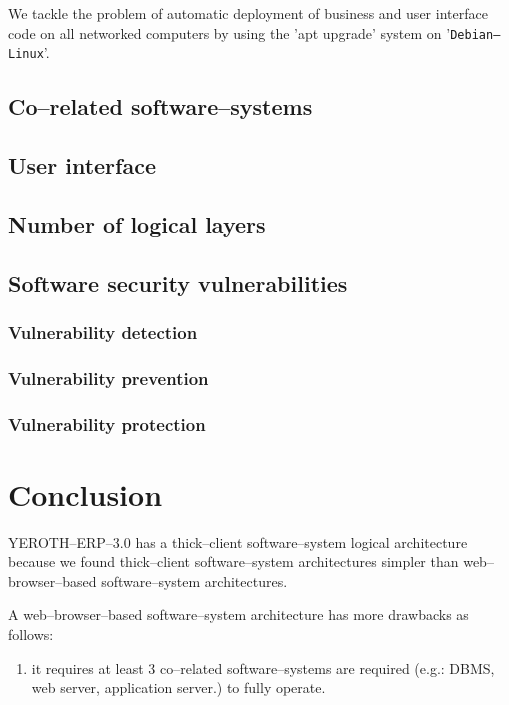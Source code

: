 \documentclass[a4paper, 10pt]{article}
\newcommand{\debianlinux}{\texttt{Debian--Linux}\xspace}
\newcommand{\webbrowserbased}{web--browser--based\xspace}
\newcommand{\yerotherpblack}{YEROTH--ERP--$3.0$\xspace}
\newcommand{\thickclient}{thick--client\xspace}
\begin{document}
\begin{multicols}{2}
We tackle the problem of automatic deployment of
business and user interface code on all networked
computers by using the 'apt upgrade' system 
on '\debianlinux'.

\subsection{Co--related software--systems}


\subsection{User interface}


\subsection{Number of logical layers}


\subsection{Software security vulnerabilities}

\subsubsection{Vulnerability detection}

\subsubsection{Vulnerability prevention}

\subsubsection{Vulnerability protection}

\section{Conclusion}

\yerotherpblack has a \thickclient
software--system logical architecture
because we found \thickclient software--system
architectures simpler than \webbrowserbased
software--system architectures.

A \webbrowserbased software--system
architecture has more drawbacks as
follows:

\begin{enumerate}[1)]
	\item it requires at least $3$ co--related 
		software--systems are required 
		(e.g.: DBMS, web server, application server.)
		to fully operate.
		

\end{enumerate}
\end{multicols}
\end{document}
